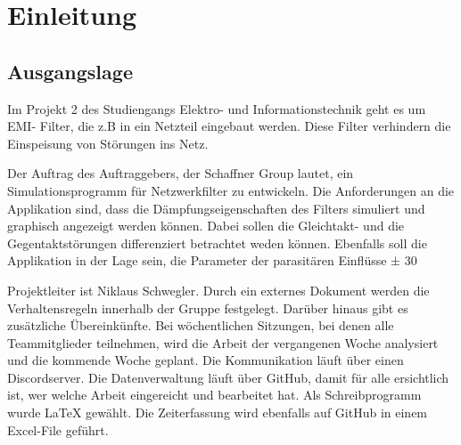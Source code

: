 \section{Einleitung}
\subsection{Ausgangslage}
Im Projekt 2 des Studiengangs Elektro- und Informationstechnik geht es um EMI- Filter, die z.B in ein Netzteil eingebaut werden. Diese Filter verhindern die Einspeisung von Störungen ins Netz.

 



Der Auftrag des Auftraggebers, der Schaffner Group lautet, ein Simulationsprogramm für Netzwerkfilter zu entwickeln. Die Anforderungen an die Applikation sind, dass die Dämpfungseigenschaften des Filters simuliert und graphisch angezeigt werden können. Dabei sollen die Gleichtakt- und die Gegentaktstörungen differenziert betrachtet weden können. Ebenfalls soll die Applikation in der Lage sein, die Parameter der parasitären Einflüsse  ± 30 %
 
Projektleiter ist Niklaus Schwegler. Durch ein externes Dokument werden die Verhaltensregeln innerhalb der Gruppe festgelegt. Darüber hinaus gibt es zusätzliche Übereinkünfte. Bei wöchentlichen Sitzungen, bei denen alle Teammitglieder teilnehmen, wird die Arbeit der  vergangenen Woche analysiert und die kommende Woche geplant. Die Kommunikation läuft über einen Discordserver. Die Datenverwaltung läuft über GitHub, damit für alle ersichtlich ist, wer welche Arbeit eingereicht und bearbeitet hat. Als Schreibprogramm wurde LaTeX gewählt. Die Zeiterfassung wird ebenfalls auf GitHub in einem Excel-File geführt.





